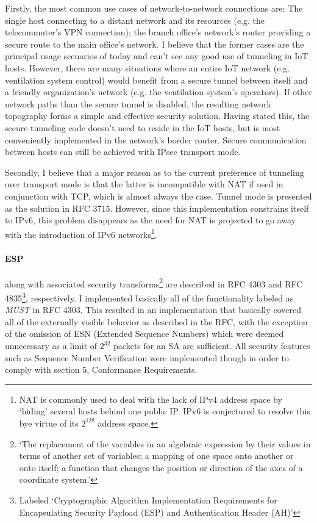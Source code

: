 \documentclass[final,a4paper,twoside,11pt,onecolumn]{report}
\begin{document}
Firstly, the most common use cases of network-to-network connections are: The single host connecting to a distant network and its resources (e.g. the telecommuter's VPN connection); the branch office's network's router providing a secure route to the main office's network. I believe that the former cases are the principal usage scenarios of today and can't see any good use of tunneling in IoT hosts. However, there are many situations where an entire IoT network (e.g. ventilation system control) would benefit from a secure tunnel between itself and a friendly organization's network (e.g. the ventilation system's operators). If other network paths than the secure tunnel is disabled, the resulting network topography forms a simple and effective security solution. Having stated this, the secure tunneling code doesn't need to reside in the IoT hosts, but is most conveniently implemented in the network's border router. Secure communication between hosts can still be achieved with IPsec transport mode.

Secondly, I believe that a major reason as to the current preference of tunneling over transport mode is that the latter is incompatible with NAT if used in conjunction with TCP, which is almost always the case. Tunnel mode is presented as the solution in RFC 3715\cite[2.1.b)]{rfc3715}. However, since this implementation constrains itself to IPv6, this problem disappears as the need for NAT is projected to go away with the introduction of IPv6 networks\footnote{NAT is commonly used to deal with the lack of IPv4 address space by `hiding' several hosts behind one public IP. IPv6 is conjectured to resolve this bye virtue of its $2^{128}$ address space.}.

\paragraph{ESP} along with associated security transforms\footnote{`The replacement of the variables in an algebraic expression by their values in terms of another set of variables; a mapping of one space onto another or onto itself; a function that changes the position or direction of the axes of a coordinate system.'\cite{wiki:transforms}} are described in RFC 4303\cite{rfc4303} and RFC 4835\cite{rfc4835}\footnote{Labeled `Cryptographic Algorithm Implementation Requirements for Encapsulating Security Payload (ESP) and Authentication Header (AH)'}, respectively. I implemented basically all of the functionality labeled as \emph{MUST} in RFC 4303. This resulted in an implementation that basically covered all of the externally visible behavior as described in the RFC, with the exception of the omission of ESN (Extended Sequence Numbers) which were deemed unnecessary as a limit of $2^{32}$ packets for an SA are sufficient. All security features such as Sequence Number Verification\citep[3.4.3]{rfc4303} were implemented though in order to comply with section 5, Conformance Requirements\citep[section 5]{rfc4303}.
\end{document}
